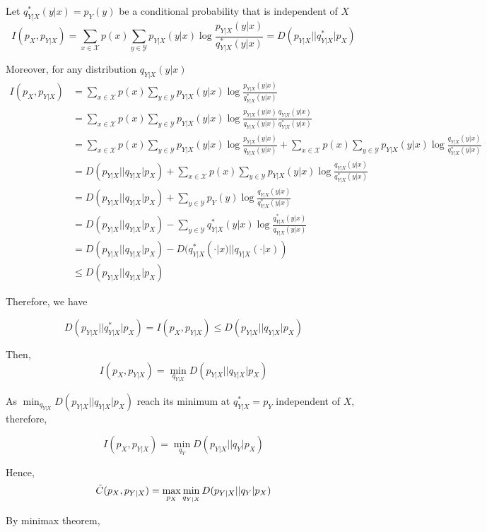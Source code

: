 \documentclass{article}
\begin{document}
Let $q_{Y|X}^*(y | x) = p_Y(y)$ be a conditional probability that is independent of $X$
$$
    I(p_X, p_{Y|X}) = \sum_{x \in \mathcal{X}}  p(x) \sum_{y \in \mathcal{Y}} p_{Y|X}(y | x)  \log \frac{p_{Y|X}(y | x)}{q_{Y|X}^*(y | x)} = D(p_{Y|X} || q_{Y|X}^* | p_X)
$$

Moreover, for any distribution $q_{Y|X}(y | x)$
\begin{align*}
    I(p_X, p_{Y|X})
    &= \sum_{x \in \mathcal{X}}  p(x) \sum_{y \in \mathcal{Y}} p_{Y|X}(y | x)  \log \frac{p_{Y|X}(y | x)}{q_{Y|X}^*(y | x)} \\
    &= \sum_{x \in \mathcal{X}}  p(x) \sum_{y \in \mathcal{Y}} p_{Y|X}(y | x)  \log \frac{p_{Y|X}(y | x)}{q_{Y|X}(y | x)} \frac{q_{Y|X}(y | x)}{q_{Y|X}^*(y | x)} \\
    &= \sum_{x \in \mathcal{X}}  p(x) \sum_{y \in \mathcal{Y}} p_{Y|X}(y | x)  \log \frac{p_{Y|X}(y | x)}{q_{Y|X}(y | x)} + \sum_{x \in \mathcal{X}}  p(x) \sum_{y \in \mathcal{Y}} p_{Y|X}(y | x)  \log \frac{q_{Y|X}(y | x)}{q_{Y|X}^*(y | x)} \\
    &= D(p_{Y|X} || q_{Y|X} | p_X) + \sum_{x \in \mathcal{X}}  p(x) \sum_{y \in \mathcal{Y}} p_{Y|X}(y | x)  \log \frac{q_{Y|X}(y | x)}{q_{Y|X}^*(y | x)} \\
    &= D(p_{Y|X} || q_{Y|X} | p_X) + \sum_{y \in \mathcal{Y}} p_{Y}(y)  \log \frac{q_{Y|X}(y | x)}{q_{Y|X}^*(y | x)} \\
    &= D(p_{Y|X} || q_{Y|X} | p_X) - \sum_{y \in \mathcal{Y}} q_{Y|X}^*(y | x)  \log \frac{q_{Y|X}^*(y | x)}{q_{Y|X}(y | x)} \\
    &= D(p_{Y|X} || q_{Y|X} | p_X) - D(q_{Y|X}^*(\cdot | x) || q_{Y|X}(\cdot | x)) \\
    &\leq D(p_{Y|X} || q_{Y|X} | p_X)
\end{align*}

Therefore, we have

$$
    D(p_{Y|X} || q_{Y|X}^* | p_X) = I(p_X, p_{Y|X}) \leq D(p_{Y|X} || q_{Y|X} | p_X)
$$

Then,
$$
    I(p_X, p_{Y|X}) = \min_{q_{Y|X}} D(p_{Y|X} || q_{Y|X} | p_X)
$$

As $\min_{q_{Y|X}} D(p_{Y|X} || q_{Y|X} | p_X)$ reach its minimum at $q_{Y|X}^* = p_Y$ independent of $X$, therefore,

$$
    I(p_X, p_{Y|X}) = \min_{q_Y} D(p_{Y|X} || q_Y | p_X)
$$

Hence, 
$$
    \Tilde{C}(p_X, p_{Y|X}) = \max_{p_X} \min_{q_{Y|X}} D(p_{Y|X} || q_Y | p_X)
$$

By minimax theorem,
\end{document}
